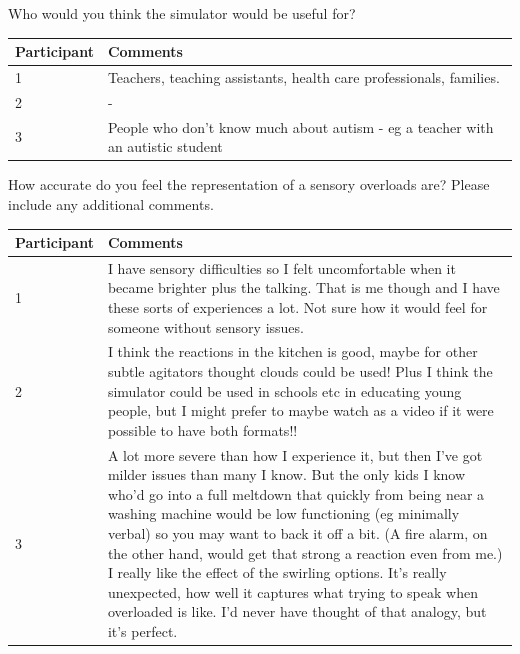 \documentclass[11pt]{report}
\begin{document}
Who would you think the simulator would be useful for?
\begin{table}[H]
    \begin{tabular}{| p{3cm} | p{12cm} |}
    \hline
     Participant & Comments \\ \hline
     1 & Teachers, teaching assistants, health care professionals, families. \\ \hline
     2 & - \\ \hline
     3 & People who don't know much about autism - eg a teacher with an autistic student \\ \hline
    \end{tabular}
\end{table}

How accurate do you feel the representation of a sensory overloads are? Please include any additional comments.
\begin{table}[H]
    \begin{tabular}{| p{3cm} | p{12cm} |}
    \hline
     Participant & Comments \\ \hline
     1 & I have sensory difficulties so I felt uncomfortable when it became brighter plus the talking. That is me though and I have these sorts of experiences a lot. Not sure how it would feel for someone without sensory issues. \\ \hline
     2 & I think the reactions in the kitchen is good, maybe for other subtle agitators thought clouds could be used! Plus I think the simulator could be used in schools etc in educating young people, but I might prefer to maybe watch as a video if it were possible to have both formats!! \\ \hline
     3 & A lot more severe than how I experience it, but then I've got milder issues than many I know. But the only kids I know who'd go into a full meltdown that quickly from being near a washing machine would be low functioning (eg minimally verbal) so you may want to back it off a bit. (A fire alarm, on the other hand, would get that strong a reaction even from me.) I really like the effect of the swirling options. It's really unexpected, how well it captures what trying to speak when overloaded is like. I'd never have thought of that analogy, but it's perfect. \\ \hline
    \end{tabular}
\end{table}
\end{document}
